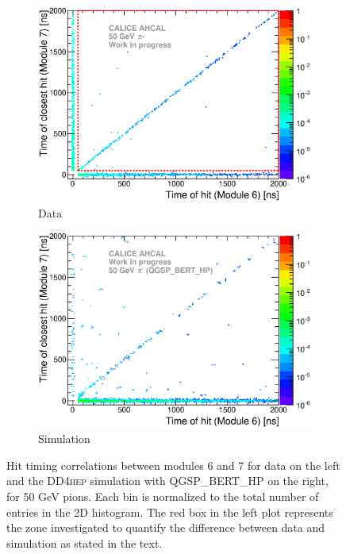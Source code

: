 \documentclass[12pt]{article}
\newcommand\ddhep{\textsc{DD4hep}\xspace}
\begin{document}
\begin{figure}[htbp!]
  \begin{subfigure}[t]{0.49\textwidth}
    \centering
    \includegraphics[width=1\textwidth]{../../Draft/fig/Time_Correlation_short.eps}
    \caption{Data} \label{fig:TimeCorr_Data_short_50GeV}
  \end{subfigure}
  \hfill
  \begin{subfigure}[t]{0.49\textwidth}
    \centering
    \includegraphics[width=1\textwidth]{../../Draft/fig/Time_Correlation_50GeV_short_QGSPBERTHP_DD4hep.eps}
    \caption{Simulation} \label{fig:TimeCorr_Data_short_50GeV_Sim}
  \end{subfigure}
  \caption{Hit timing correlations between modules 6 and 7 for data on the left and the \ddhep simulation with QGSP\_BERT\_HP on the right, for 50 GeV pions. Each bin is normalized to the total number of entries in the 2D histogram. The red box in the left plot represents the zone investigated to quantify the difference between data and simulation as stated in the text.}
  \label{fig:TimeCorr_short_50GeV}
\end{figure}
\end{document}
